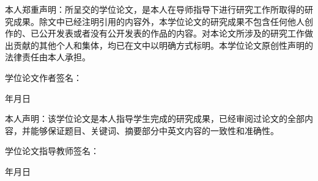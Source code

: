 \documentclass[12pt]{ctexart}
\begin{document}
\begin{spacing}{1.5}
本人郑重声明：所呈交的学位论文，是本人在导师指导下进行研究工作所取得的研究成果。除文中已经注明引用的内容外，本学位论文的研究成果不包含任何他人创作的、已公开发表或者没有公开发表的作品的内容。对本论文所涉及的研究工作做出贡献的其他个人和集体，均已在文中以明确方式标明。本学位论文原创性声明的法律责任由本人承担。

\qquad\qquad\qquad\qquad\qquad 学位论文作者签名：\qquad\qquad 

\qquad\qquad\qquad\qquad\qquad\qquad\qquad\qquad\qquad\qquad 年\qquad 月\qquad 日

本人声明：该学位论文是本人指导学生完成的研究成果，已经审阅过论文的全部内容，并能够保证题目、关键词、摘要部分中英文内容的一致性和准确性。

\qquad\qquad\qquad\qquad 学位论文指导教师签名：\qquad\qquad 

\qquad\qquad\qquad\qquad\qquad\qquad\qquad\qquad\qquad\qquad 年\qquad 月\qquad 日
\clearpage
\fancyhf{}%
\setcounter{page}{1}
\pagestyle{fancy}



\lhead{}  \rhead{}
\lfoot{} \cfoot{\thepage} \rfoot{}
\renewcommand\headrulewidth{0.3pt}






\end{spacing}
\end{document}
